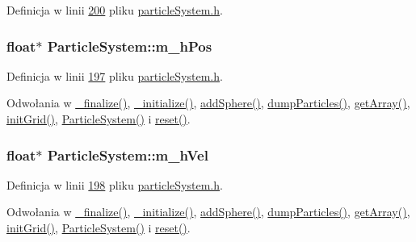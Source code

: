 Definicja w linii \hyperlink{particle_system_8h_source_l00200}{200} pliku \hyperlink{particle_system_8h_source}{particle\-System.\-h}.

\hypertarget{class_particle_system_ab9d75471d2eaaeb8fa98d2f3f47d9c25}{
\subsubsection[{m\-\_\-h\-Pos}]{\setlength{\rightskip}{0pt plus 5cm}float$\ast$ Particle\-System\-::m\-\_\-h\-Pos\hspace{0.3cm}{\ttfamily [protected]}}}\label{class_particle_system_ab9d75471d2eaaeb8fa98d2f3f47d9c25}


Definicja w linii \hyperlink{particle_system_8h_source_l00197}{197} pliku \hyperlink{particle_system_8h_source}{particle\-System.\-h}.



Odwołania w \hyperlink{particle_system_8cpp_source_l00233}{\-\_\-finalize()}, \hyperlink{particle_system_8cpp_source_l00142}{\-\_\-initialize()}, \hyperlink{particle_system_8cpp_source_l00552}{add\-Sphere()}, \hyperlink{particle_system_8cpp_source_l00360}{dump\-Particles()}, \hyperlink{particle_system_8cpp_source_l00375}{get\-Array()}, \hyperlink{particle_system_8cpp_source_l00435}{init\-Grid()}, \hyperlink{particle_system_8cpp_source_l00040}{Particle\-System()} i \hyperlink{particle_system_8cpp_source_l00465}{reset()}.

\hypertarget{class_particle_system_a20560c896ee8a8bbc827a8e5902da7e2}{
\subsubsection[{m\-\_\-h\-Vel}]{\setlength{\rightskip}{0pt plus 5cm}float$\ast$ Particle\-System\-::m\-\_\-h\-Vel\hspace{0.3cm}{\ttfamily [protected]}}}\label{class_particle_system_a20560c896ee8a8bbc827a8e5902da7e2}


Definicja w linii \hyperlink{particle_system_8h_source_l00198}{198} pliku \hyperlink{particle_system_8h_source}{particle\-System.\-h}.



Odwołania w \hyperlink{particle_system_8cpp_source_l00233}{\-\_\-finalize()}, \hyperlink{particle_system_8cpp_source_l00142}{\-\_\-initialize()}, \hyperlink{particle_system_8cpp_source_l00552}{add\-Sphere()}, \hyperlink{particle_system_8cpp_source_l00360}{dump\-Particles()}, \hyperlink{particle_system_8cpp_source_l00375}{get\-Array()}, \hyperlink{particle_system_8cpp_source_l00435}{init\-Grid()}, \hyperlink{particle_system_8cpp_source_l00040}{Particle\-System()} i \hyperlink{particle_system_8cpp_source_l00465}{reset()}.

